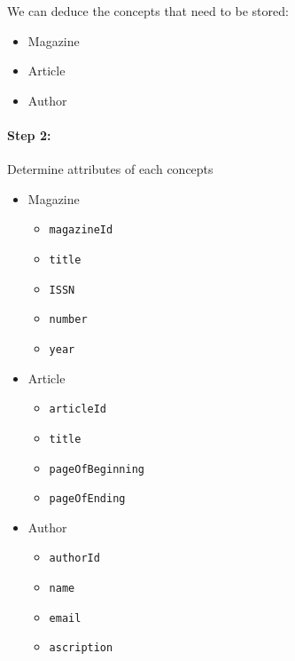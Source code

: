 \documentclass{assignment}
\begin{document}
We can deduce the concepts that need to be stored:
\begin{itemize}[noitemsep]
    \item Magazine
    \item Article
    \item Author
\end{itemize}

\paragraph{Step 2:} Determine attributes of each concepts
\\

\noindent
\begin{minipage}[t]{0.31\textwidth}
    \begin{itemize}[noitemsep]
        \item Magazine
            \begin{itemize}[noitemsep]
                \item \texttt{magazineId}
                \item \texttt{title}
                \item \texttt{ISSN}
                \item \texttt{number}
                \item \texttt{year}
            \end{itemize}
    \end{itemize}
\end{minipage}
\hfill
\begin{minipage}[t]{0.31\textwidth}
    \begin{itemize}[noitemsep]
        \item Article
            \begin{itemize}[noitemsep]
                \item \texttt{articleId}
                \item \texttt{title}
                \item \texttt{pageOfBeginning}
                \item \texttt{pageOfEnding}
            \end{itemize}
    \end{itemize}
\end{minipage}
\hfill
\begin{minipage}[t]{0.31\textwidth}
    \begin{itemize}[noitemsep]
        \item Author
            \begin{itemize}[noitemsep]
                \item \texttt{authorId}
                \item \texttt{name}
                \item \texttt{email}
                \item \texttt{ascription}
            \end{itemize}
    \end{itemize}
\end{minipage}
\end{document}
